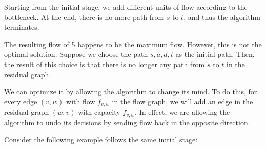 Starting from the initial stage, we add different units of flow according to the bottleneck. At the end, there is no more path from \(s\) to \(t\), and thus the algorithm terminates.

The resulting flow of 5 happens to be the maximum flow. However, this is not the optimal solution. Suppose we choose the path \(s, a, d, t\) as the initial path. Then, the result of this choice is that there is no longer any path from \(s\) to \(t\) in the residual graph.

We can optimize it by allowing the algorithm to change its mind. To do this, for every edge \((v, w)\) with flow \(f_{v, w}\) in the flow graph, we will add an edge in the residual graph \((w, v)\) with capacity \(f_{v, w}\). In effect, we are allowing the algorithm to undo its decisions by sending flow back in the opposite direction.

Consider the following example follows the same initial stage: 

